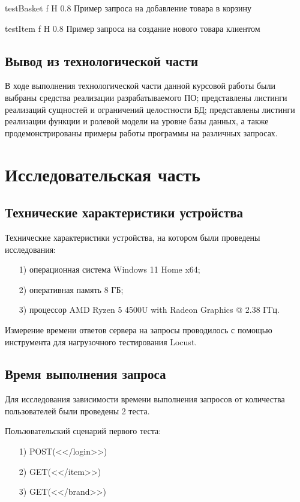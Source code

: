 \documentclass{bmstu}
\begin{document}
{testBasket}
{f}
{H}
{0.8\textwidth}
{Пример запроса на добавление товара в корзину}

{testItem}
{f}
{H}
{0.8\textwidth}
{Пример запроса на создание нового товара клиентом}


\section*{Вывод из технологической части}

В ходе выполнения технологической части данной курсовой работы были выбраны средства реализации разрабатываемого ПО; представлены листинги реализаций сущностей и ограничений целостности БД; представлены листинги реализации функции и ролевой модели на уровне базы данных, а также продемонстрированы примеры работы программы на различных запросах.

\chapter{Исследовательская часть}

\section{Технические характеристики устройства}

Технические характеристики устройства, на котором были проведены исследования:

\begin{enumerate}
\item[1)]
операционная система Windows 11 Home x64;
\item[2)]
оперативная память 8 ГБ;
\item[3)]
процессор AMD Ryzen 5 4500U with Radeon Graphics @ 2.38 ГГц.
\end{enumerate}

Измерение времени ответов сервера на запросы проводилось с помощью инструмента для нагрузочного тестирования Locust.

\section{Время выполнения запроса}

Для исследования зависимости времени выполнения запросов от количества пользователей были проведены 2 теста.

Пользовательский сценарий первого теста:

\begin{enumerate}
	\item[1)]
	POST(<</login>>)
	\item[2)]
	GET(<</item>>)
	\item[3)]
	GET(<</brand>>)
\end{enumerate}
\end{document}

